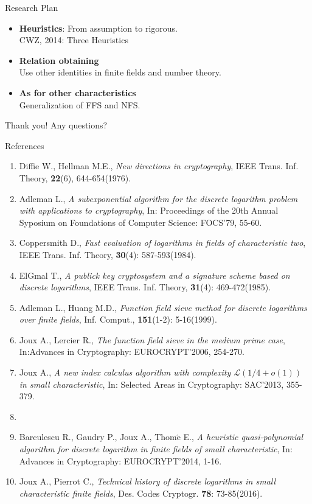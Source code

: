 \documentclass{beamer}
\begin{document}
	\begin{frame}{Research Plan}
		\begin{itemize}
			\item \textbf{Heuristics}: From assumption to rigorous.\\
				CWZ, 2014: Three Heuristics
				\pause
			\item \textbf{Relation obtaining}\\
				Use other identities in finite fields and number theory.
				\pause
			\item \textbf{As for other characteristics}\\
				Generalization of FFS and NFS.
		\end{itemize}
	\end{frame}
	
	\begin{frame}
		Thank you! Any questions?
	\end{frame}
	
	\begin{frame}{References}
		\tiny{\begin{enumerate}
			\item
				Diffie W., Hellman M.E., \emph{New directions in cryptography},
				IEEE Trans. Inf. Theory, \textbf{22}(6), 644-654(1976). 
			\item
				Adleman L., \emph{A subexponential algorithm for the discrete logarithm problem with applications to cryptography},
				In: Proceedings of the 20th Annual Syposium on Foundations of Computer Science: FOCS'79, 55-60.
			\item
				Coppersmith D., \emph{Fast evaluation of logarithms in fields of characteristic two},
				IEEE Trans. Inf. Theory, \textbf{30}(4): 587-593(1984).
			\item
				ElGmal T., \emph{A publick key cryptosystem and a signature scheme based on discrete logarithms},
				IEEE Trans. Inf. Theory, \textbf{31}(4): 469-472(1985).
			\item
				Adleman L., Huang M.D., \emph{Function field sieve method for discrete logarithms over finite fields},
				Inf. Comput., \textbf{151}(1-2): 5-16(1999).
			\item
				Joux A., Lercier R., \emph{The function field sieve in the medium prime case},
				In:Advances in Cryptography: EUROCRYPT'2006, 254-270.
			\item
				Joux A., \emph{A new index calculus algorithm with complexity $\mathcal{L}(1/4 + o(1))$ in small characteristic},
				In: Selected Areas in Cryptography: SAC'2013, 355-379.
			\item
				
			\item
				Barculescu R., Gaudry P., Joux A., Thom$\acute{\text{e}}$ E., \emph{A heuristic quasi-polynomial algorithm for discrete logarithm in finite fields of small characteristic}, In: Advances in Cryptography: EUROCRYPT'2014, 1-16.
			\item
				Joux A., Pierrot C., \emph{Technical history of discrete logarithms in small characteristic finite fields}, 
				Des. Codes Cryptogr. \textbf{78}: 73-85(2016).
			\end{enumerate}
			}
	\end{frame}
\end{document}
